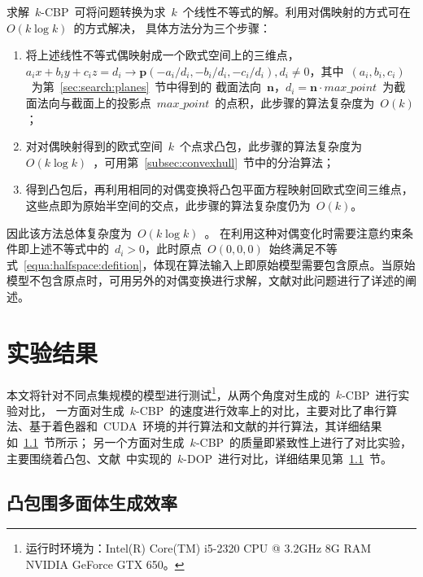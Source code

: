 求解~$k$-CBP~可将问题转换为求~$k$~个线性不等式的解。利用对偶映射的方式可在~$O(k \log k)$~的方式解决，
具体方法分为三个步骤\cite{Preparata1985Introduction}：
\begin{enumerate}[(1)]
\item   
将上述线性不等式偶映射成一个欧式空间上的三维点，
$a_ix+b_iy+c_iz=d_i \rightarrow \bm{p}(-a_i/d_i, -b_i/d_i,-c_i/d_i),d_i \neq 0$，其中~$(a_i,b_i,c_i)$~为第~\ref{sec:search:planes}~节中得到的
截面法向~$\bm{n}$，$d_i=\bm{n} \cdot
max\_point$~为截面法向与截面上的投影点~$max\_point$~的点积，此步骤的算法复杂度为~$O(k)$；
\item
  对对偶映射得到的欧式空间~$k$~个点求凸包，此步骤的算法复杂度为~$O(k\log k)$~，可用第~\ref{subsec:convexhull}~节中的分治算法；
\item
  得到凸包后，再利用相同的对偶变换将凸包平面方程映射回欧式空间三维点，这些点即为原始半空间的交点，此步骤的算法复杂度仍为~$O(k)$。
\end{enumerate}

因此该方法总体复杂度为~$O(k\log k)$~。
在利用这种对偶变化时需要注意约束条件即上述不等式中的~$d_i>0$，此时原点~$O(0,0,0)$~始终满足不等式~\ref{equa:halfspace:defition}，体现在算法输入上即原始模型需要包含原点。当原始模型不包含原点时，可用另外的对偶变换进行求解，文献对此问题进行了详述的阐述。

\section{实验结果}
\label{sec:exper-kcbp}

本文将针对不同点集规模的模型进行测试\footnote{运行时环境为：Intel(R) Core(TM)
i5-2320 CPU @ 3.2GHz 8G RAM NVIDIA GeForce GTX
650。}，从两个角度对生成的~$k$-CBP~进行实验对比，
一方面对生成~$k$-CBP~的速度进行效率上的对比，主要对比了串行算法、基于着色器和~CUDA~环境的并行算法和文献的并行算法，其详细结果如~\ref{subsec:exper:efficiency}~节所示；
另一个方面对生成~$k$-CBP~的质量即紧致性上进行了对比实验，主要围绕着凸包、文献~中实现的~$k$-DOP~进行对比，详细结果见第~\ref{subsec:exper:efficiency}~节。

\subsection{凸包围多面体生成效率}
\label{subsec:exper:efficiency}

